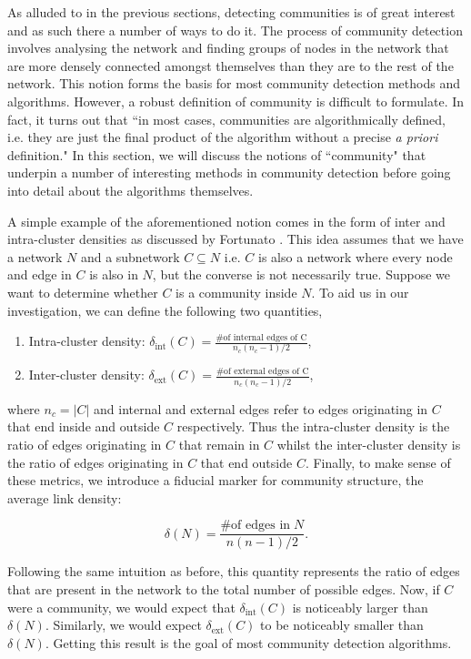 As alluded to in the previous sections, detecting communities is of great interest and as such there a number of ways to do it. The process of community detection involves analysing the network and finding groups of nodes in the network that are more densely connected amongst themselves than they are to the rest of the network. This notion forms the basis for most community detection methods and algorithms. However, a robust definition of community is difficult to formulate. In fact, it turns out that ``in most cases, communities are algorithmically defined, i.e. they are just the final product of the algorithm without a precise \emph{a priori} definition." \cite[84]{fortunato} In this section, we will discuss the notions of ``community" that underpin a number of interesting methods in community detection before going into detail about the algorithms themselves.

A simple example of the aforementioned notion comes in the form of inter and intra-cluster densities as discussed by Fortunato \cite[84]{fortunato}. This idea assumes that we have a network $N$ and a subnetwork $C \subseteq N$ i.e. $C$ is also a network where every node and edge in $C$ is also in $N$, but the converse is not necessarily true. Suppose we want to determine whether $C$ is a community inside $N$. To aid us in our investigation, we can define the following two quantities,

\begin{enumerate}
    \item Intra-cluster density: $\delta_{\text{int}}(C) = \frac{\text{\# of internal edges of C}}{n_c(n_c - 1)/2} $,
    \item Inter-cluster density: $\delta_{\text{ext}}(C) = \frac{\text{\# of external edges of C}}{n_c(n_c - 1)/2} $,
\end{enumerate}

where $n_c = |C|$ and internal and external edges refer to edges originating in $C$ that end inside and outside $C$ respectively. Thus the intra-cluster density is the ratio of edges originating in $C$ that remain in $C$ whilst the inter-cluster density is the ratio of edges originating in $C$ that end outside $C$. Finally, to make sense of these metrics, we introduce a fiducial marker for community structure, the average link density:

$$ \delta(N) = \frac{\text{\# of edges in}\; N}{n(n-1)/2}. $$

Following the same intuition as before, this quantity represents the ratio of edges that are present in the network to the total number of possible edges. Now, if $C$ were a community, we would expect that $\delta_{\text{int}}(C)$ is noticeably larger than $\delta(N)$. Similarly, we would expect $\delta_{\text{ext}}(C)$ to be noticeably smaller than $\delta(N)$. Getting this result is the goal of most community detection algorithms.


